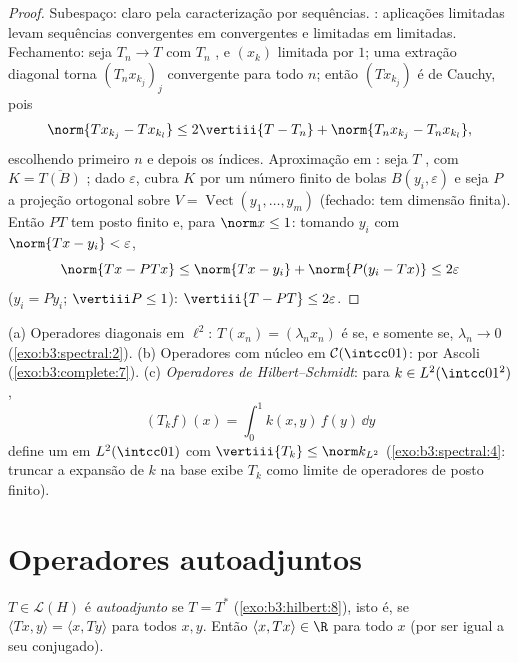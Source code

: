 \begin{proof}
Subespaço: claro pela caracterização por sequências. : aplicações
limitadas levam sequências convergentes em convergentes e limitadas em
limitadas. Fechamento: seja $T_n \to T$ com $T_n$ , e $(x_k)$
limitada por $1$; uma extração diagonal torna $(T_nx_{k_j})_j$ convergente para
todo $n$; então $(Tx_{k_j})$ é de Cauchy, pois
\[
\norm{Tx_{k_j} - Tx_{k_l}} \leq 2\vertiii{T - T_n} +
\norm{T_nx_{k_j} - T_nx_{k_l}} ,
\]
escolhendo primeiro $n$ e depois os índices. Aproximação em : seja $T$ , com $K = \overline{T(B)}$ ; dado $\varepsilon$, cubra
$K$ por um número finito de bolas $B(y_i, \varepsilon)$ e seja $P$ a projeção
ortogonal sobre $V = \operatorname{Vect}(y_1, \dots, y_m)$ (fechado: tem dimensão finita). Então $PT$ tem
posto finito e, para $\norm x \leq 1$: tomando $y_i$ com $\norm{Tx - y_i} <
\varepsilon$,
\[
\norm{Tx - PTx} \leq \norm{Tx - y_i} + \norm{P(y_i - Tx)}
\leq 2\varepsilon
\]
($y_i = Py_i$; $\vertiii P \leq 1$): $\vertiii{T - PT} \leq
2\varepsilon$.
\end{proof}

\begin{example}\label{ex:b3:spectral:examples}
(a) Operadores diagonais em $\ell^2$: $T(x_n) = (\lambda_nx_n)$ é  se, e somente
se, $\lambda_n \to 0$ (\cref{exo:b3:spectral:2}).
(b) Operadores com núcleo em $\mathcal C(\intcc01)$:  por Ascoli
(\cref{exo:b3:complete:7}).
(c) \emph{Operadores de Hilbert--Schmidt}: para $k \in L^2(\intcc01^2)$,
\[
(T_kf)(x) = \int_0^1k(x, y)\,f(y)\,\dd y
\]
define um  em $L^2(\intcc01)$ com $\vertiii{T_k} \leq \norm k_{L^2}$ (\cref{exo:b3:spectral:4}: truncar a
expansão de $k$ na base exibe $T_k$ como limite de operadores de
posto finito).
\end{example}

\section{Operadores autoadjuntos}

\begin{definition}\label{def:b3:spectral:selfadjoint}
$T \in \mathcal L(H)$ é \emph{autoadjunto} se $T = T^*$
(\cref{exo:b3:hilbert:8}), isto é, se $\langle Tx, y\rangle = \langle x, Ty\rangle$ para todos $x, y$. Então $\langle x, Tx\rangle \in \R$ para
todo $x$ (por ser igual a seu conjugado).
\end{definition}

